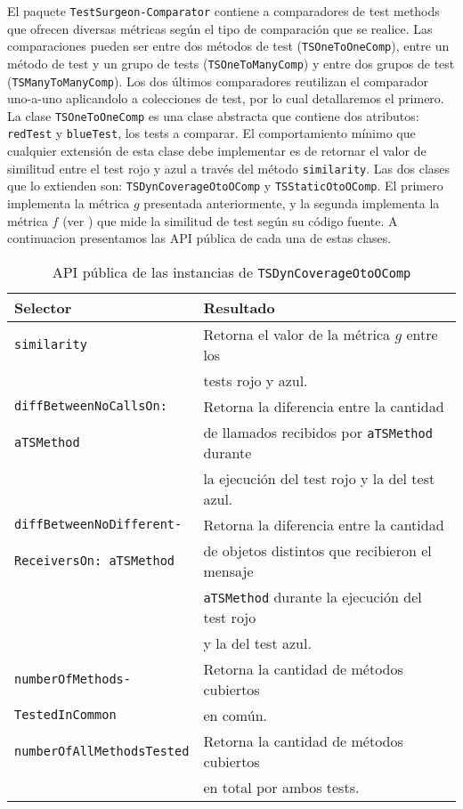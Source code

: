 \vspace*{2cm}

\par El paquete {\tt TestSurgeon-Comparator} contiene a comparadores de test methods que ofrecen diversas métricas según el tipo de comparación que se realice. Las comparaciones pueden ser entre dos métodos de test ({\tt TSOneToOneComp}), entre un método de test y un grupo de tests ({\tt TSOneToManyComp}) y entre dos grupos de test ({\tt TSManyToManyComp}). Los dos últimos comparadores reutilizan el comparador uno-a-uno aplicandolo a colecciones de test, por lo cual detallaremos el primero. La clase {\tt TSOneToOneComp} es una clase abstracta que contiene dos atributos: {\tt redTest} y {\tt blueTest}, los tests a comparar. El comportamiento mínimo que cualquier extensión de esta clase debe implementar es de retornar el valor de similitud entre el test rojo y azul a través del método {\tt similarity}. Las dos clases que lo extienden son: {\tt TSDynCoverageOtoOComp} y {\tt TSStaticOtoOComp}. El primero implementa la métrica $g$ presentada anteriormente, y la segunda implementa la métrica $f$ (ver ) que mide la similitud de test según su código fuente. A continuacion presentamos las API pública de cada una de estas clases.



\begin{table}[h] 
    \centering 
    \begin{tabular}{|l|l|}
    	\hline
\textbf{Selector} & \textbf{Resultado} \\ \hline \hline

{\tt similarity } & Retorna el valor de la métrica $g$ entre los \\
				 & tests rojo y azul. \\ \hline	
{\tt diffBetweenNoCallsOn:} & Retorna la diferencia entre la cantidad \\ 
{\tt  aTSMethod}		& de llamados recibidos por {\tt aTSMethod} durante  \\ 
						& la ejecución del test rojo y la del test azul.\\ \hline
{\tt diffBetweenNoDifferent-}	& Retorna la diferencia entre la cantidad \\ 
{\tt ReceiversOn: aTSMethod } &  de objetos distintos que recibieron el mensaje  \\
						& {\tt aTSMethod} durante la ejecución del test rojo \\
						& y la del test azul.\\ \hline
{\tt numberOfMethods- } & Retorna la cantidad de métodos cubiertos\\
{\tt TestedInCommon}						&  en común.\\ \hline
{\tt numberOfAllMethodsTested} & Retorna la cantidad de métodos cubiertos \\
						& en total por ambos tests. \\ \hline		
				
    \end{tabular}
    \caption{API pública de las instancias de {\tt TSDynCoverageOtoOComp}}
\end{table} 




